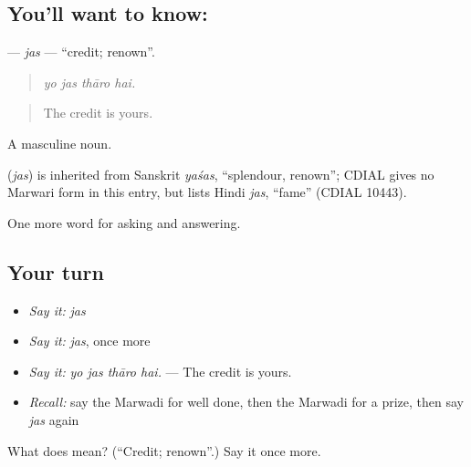 \subsection*{You'll want to know: }
\textbf{} — \emph{jas} — \textquotedblleft{}credit; renown\textquotedblright{}.

\begin{quote}
   
\end{quote}

\begin{quote}
\emph{yo jas thāro hai.}
\end{quote}

\begin{quote}
The credit is yours.
\end{quote}

A masculine noun.

\begin{cousinweb}
\textbf{} (\emph{jas}) is inherited from Sanskrit \emph{yaśas}, \textquotedblleft{}splendour, renown\textquotedblright{}; CDIAL gives no Marwari form in this entry, but lists Hindi \emph{jas}, \textquotedblleft{}fame\textquotedblright{} (CDIAL 10443).
\end{cousinweb}

\begin{grammarlens}[title={What you've built}]
One more word for asking and answering.
\end{grammarlens}

\subsection*{Your turn}
\begin{itemize}
\raggedright
  \item \emph{Say it:} \emph{jas}
  \item \emph{Say it:} \emph{jas}, once more
  \item \emph{Say it:} \emph{yo jas thāro hai.} — The credit is yours.
  \item \emph{Recall:} say the Marwadi for well done, then the Marwadi for a prize, then say \emph{jas} again
\end{itemize}

\begin{tcolorbox}[breakable,colback=teal!4,colframe=teal!35!black,title={Before you move on}]
What does  mean? (\textquotedblleft{}Credit; renown\textquotedblright{}.) Say it once more.
\end{tcolorbox}
